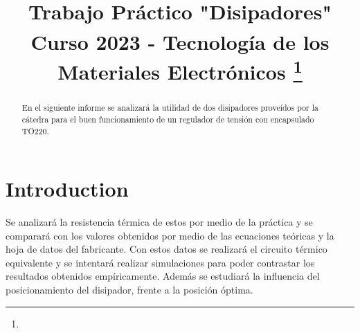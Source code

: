\documentclass[conference]{IEEEtran}
\begin{document}
\title{Trabajo Práctico "Disipadores"\\
{\footnotesize \textsuperscript{}Curso 2023 - Tecnología de los Materiales Electrónicos}
\thanks{}
}

\author{
\and
{}
}

\maketitle


\begin{abstract}
En el siguiente informe se analizará la utilidad de dos disipadores proveídos por la cátedra
para el buen funcionamiento de un regulador de tensión con encapsulado TO220.
\end{abstract}

\section{Introduction}
Se analizará la resistencia térmica de estos por medio de la práctica y se comparará con los valores 
obtenidos por medio de las ecuaciones teóricas y la hoja de datos del fabricante. Con estos datos
se realizará el circuito térmico equivalente y se intentará realizar simulaciones para poder contrastar
los resultados obtenidos empíricamente. Además se estudiará la influencia del posicionamiento del disipador,
frente a la posición óptima.
\end{document}

